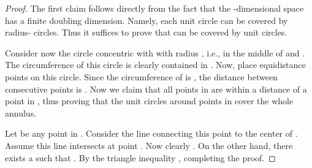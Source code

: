 \documentclass[11pt]{amsart}
\begin{document}
\begin{proof}
The first claim follows directly from the fact that the -dimensional space has a finite doubling dimension.
Namely, each unit circle can be covered by  radius- circles.
Thus it suffices to prove that  can be covered
by  unit circles.

Consider now the circle  concentric with  with
radius , i.e., in the middle of  and . 
The circumference of this circle is clearly contained in
. Now, place  equidistance
points  on this circle. Since the circumference of  is 
, the distance between consecutive points is . 
Now we
claim that all points in  are within a distance
 of a point in , thus proving that the unit circles
around points in  cover the whole annulus.

Let  be any point in . Consider the line
connecting this point to the center of .  Assume this line
intersects  at point . Now clearly . On the
other hand, there exists a  such that . By the triangle inequality , completing the
proof.
\end{proof}
\end{document}
